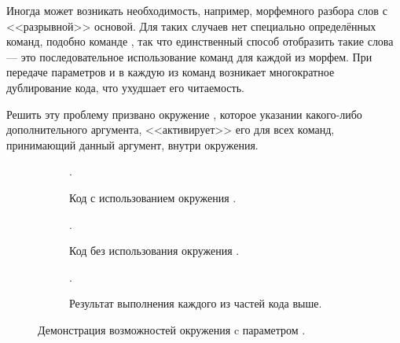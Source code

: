 \ExplSyntaxOn{}
\begin{tcolorbox}
\end{tcolorbox}
\ExplSyntaxOff{}

Иногда может возникать необходимость, например, морфемного разбора слов с <<разрывной>> основой. Для таких случаев нет специально
определённых команд, подобно команде , так что единственный способ отобразить такие слова --- это
последовательное использование команд для каждой из морфем. При передаче параметров  и  в каждую из
команд возникает многократное дублирование кода, что ухудшает его читаемость.

Решить эту проблему призвано окружение , которое указании какого-либо дополнительного аргумента, <<активирует>> его для всех команд, принимающий данный аргумент, внутри окружения.
\begin{figure}[htp!]
    \centering
    \begin{subfigure}{\textwidth}
        \begin{Latexcode}
            \begin{rslingu}[color]
                  
                 .
            \end{rslingu}
        \end{Latexcode}
        \caption{Код с использованием окружения .}
    \end{subfigure}\vspace*{.75cm}
    \begin{subfigure}{\textwidth}
        \begin{Latexcode}
             
             
            .
        \end{Latexcode}
        \caption{Код без использования окружения .}
    \end{subfigure}\vspace*{.75cm}
    \begin{subfigure}{.9\textwidth}
        \centering
        \begin{rslingu}[color]
              
             .
        \end{rslingu}
        \caption{Результат выполнения каждого из частей кода выше.}
    \end{subfigure}
    \caption{Демонстрация возможностей окружения  c параметром .}
\end{figure}



